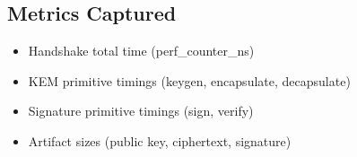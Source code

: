 \documentclass[11pt,a4paper,twoside]{article}
\begin{document}
\subsection{Metrics Captured}
\begin{itemize}
    \item Handshake total time (perf\_counter\_ns)
    \item KEM primitive timings (keygen, encapsulate, decapsulate)
    \item Signature primitive timings (sign, verify)
    \item Artifact sizes (public key, ciphertext, signature)
\end{itemize}
\end{document}
